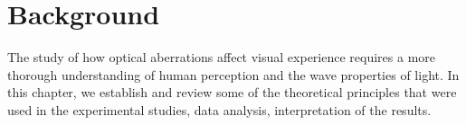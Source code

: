 
\chapter{Background}
\label{chap:Background}

The study of how optical aberrations affect visual experience requires a more thorough understanding of human perception and the wave properties of light. In this chapter, we establish and review some of the theoretical principles that were used in the experimental studies, data analysis, interpretation of the results.







	

	


